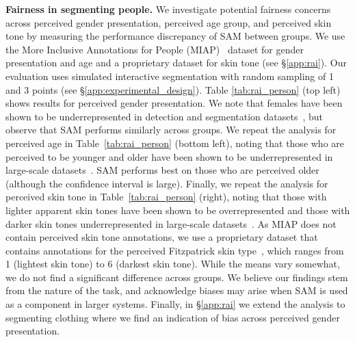 \documentclass[10pt,twocolumn,letterpaper]{article}
\renewcommand{\paragraph}[1]{\vspace{1.25mm}\noindent\textbf{#1}}
\newcommand{\sam}{SAM\xspace}
\begin{document}
\paragraph{Fairness in segmenting people.} We investigate potential fairness concerns across perceived gender presentation, perceived age group, and perceived skin tone by measuring the performance discrepancy of \sam between groups. We use the More Inclusive Annotations for People (MIAP)~\cite{schumann2021step} dataset for gender presentation and age and a proprietary dataset for skin tone (see \S\ref{app:rai}). Our evaluation uses simulated interactive segmentation with random sampling of 1 and 3 points (see \S\ref{app:experimental_design}). Table \ref{tab:rai_person} (top left) shows results for perceived gender presentation. We note that females have been shown to be underrepresented in detection and segmentation datasets~\cite{zhao2017}, but observe that \sam performs similarly across groups. We repeat the analysis for perceived age in Table~\ref{tab:rai_person} (bottom left), noting that those who are perceived to be younger and older have been shown to be underrepresented in large-scale datasets~\cite{yang2020towards}. \sam performs best on those who are perceived older (although the confidence interval is large). Finally, we repeat the analysis for perceived skin tone in Table~\ref{tab:rai_person} (right), noting that those with lighter apparent skin tones have been shown to be overrepresented and those with darker skin tones underrepresented in large-scale datasets~\cite{yang2020towards}. As MIAP does not contain perceived skin tone annotations, we use a proprietary dataset that contains annotations for the perceived Fitzpatrick skin type~\cite{fitzpatrick1988}, which ranges from 1 (lightest skin tone) to 6 (darkest skin tone). While the means vary somewhat, we do not find a significant difference across groups. We believe our findings stem from the nature of the task, and acknowledge biases may arise when \sam is used as a component in larger systems. Finally, in \S\ref{app:rai} we extend the analysis to segmenting clothing where we find an indication of bias across perceived gender presentation.
\end{document}
